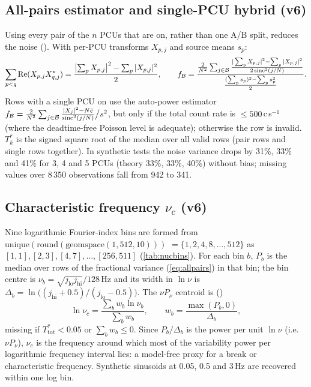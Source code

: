 \subsection{All-pairs estimator and single-PCU hybrid (v6)}\label{sec:allpairs}
Using every pair of the $n$ PCUs that are on, rather than one A/B split, reduces the noise ().
With per-PCU transforms $X_{p,j}$ and source means $s_p$:
\begin{equation}
\sum_{p<q}\operatorname{Re}(X_{p,j}X_{q,j}^*) = \frac{\bigl|\sum_p X_{p,j}\bigr|^2-\sum_p|X_{p,j}|^2}{2},\qquad
f_\mathcal{B} = \frac{\frac{2}{N^2}\sum_{j\in\mathcal B}\frac{|\sum_pX_{p,j}|^2-\sum_p|X_{p,j}|^2}{2\operatorname{sinc}^2(j/N)}}{\frac{(\sum_p s_p)^2-\sum_p s_p^2}{2}} .\label{eq:allpairs}
\end{equation}
Rows with a single PCU on use the auto-power estimator $f_\mathcal{B} = \frac{2}{N^2}\sum_{j\in\mathcal B}
\frac{|X_j|^2-N\bar c}{\operatorname{sinc}^2(j/N)}\big/ s^2$, but only if the total count rate is $\le 500$\,c\,s$^{-1}$ (where the
deadtime-free Poisson level is adequate); otherwise the row is invalid. $T_k^\ast$ is the signed square root of the
median over all valid rows (pair rows and single rows together). In synthetic tests the noise variance drops by 31\%,
33\% and 41\% for 3, 4 and 5 PCUs (theory 33\%, 33\%, 40\%) without bias; missing values over 8\,350 observations fall from
942 to 341.

\subsection{Characteristic frequency $\nu_c$ (v6)}\label{sec:nuc}
Nine logarithmic Fourier-index bins are formed from $\mathrm{unique}(\mathrm{round}(\mathrm{geomspace}(1,512,10)))$
$=\{1,2,4,8,\dots,512\}$ as $[1,1],[2,3],[4,7],\dots,[256,511]$ (\cref{tab:nucbins}). For each bin $b$, $P_b$ is the
median over rows of the fractional variance (\cref{eq:allpairs}) in that bin; the bin centre is
$\nu_b=\sqrt{j_\mathrm{lo}j_\mathrm{hi}}/128$\,Hz and its width in $\ln\nu$ is
$\Delta_b = \ln\bigl((j_\mathrm{hi}+0.5)/(j_\mathrm{lo}-0.5)\bigr)$. The $\nu P_\nu$ centroid is ()
\begin{equation}
\ln\nu_c = \frac{\sum_b w_b\ln\nu_b}{\sum_b w_b},\qquad w_b = \frac{\max(P_b,0)}{\Delta_b},\label{eq:nuc}
\end{equation}
missing if $T^\ast_\mathrm{tot}<0.05$ or $\sum_b w_b\le0$. Since $P_b/\Delta_b$ is the power per unit $\ln\nu$ (i.e.\
$\nu P_\nu$), $\nu_c$ is the frequency around which most of the variability power per logarithmic frequency interval lies:
a model-free proxy for a break or characteristic frequency. Synthetic sinusoids at 0.05, 0.5 and 3\,Hz are recovered
within one log bin.

